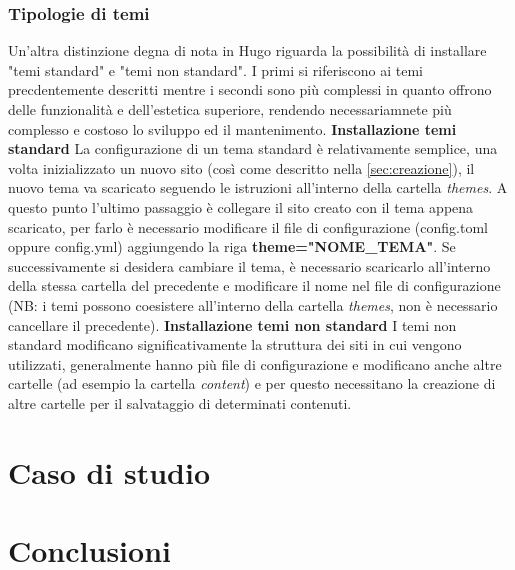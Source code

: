 \documentclass[target=bach,aauheader=]{thud}
\begin{document}
\subsection{Tipologie di temi}
Un'altra distinzione degna di nota in Hugo riguarda la possibilità di installare "temi standard" e "temi non standard". I primi si riferiscono ai temi precdentemente descritti mentre i secondi sono più complessi in quanto offrono delle funzionalità e dell'estetica superiore, rendendo necessariamnete più complesso e costoso lo sviluppo ed il mantenimento.
\newline \newline
\textbf{{\fontsize{12}{14}\selectfont Installazione temi standard}}
\newline \newline
La configurazione di un tema standard è relativamente semplice, una volta inizializzato un nuovo sito (così come descritto nella \cref{sec:creazione}), il nuovo tema va scaricato seguendo le istruzioni all'interno della cartella \textit{themes}. 
A questo punto l'ultimo passaggio è collegare il sito creato con il tema appena scaricato, per farlo è necessario modificare il file di configurazione (config.toml oppure config.yml) aggiungendo la riga \textbf{theme="NOME\_TEMA"}.
\newline
Se successivamente si desidera cambiare il tema, è necessario scaricarlo all'interno della stessa cartella del precedente e modificare il nome nel file di configurazione (NB: i temi possono coesistere all'interno della cartella \textit{themes}, non è necessario cancellare il precedente).
\newline \newline
\textbf{{\fontsize{12}{14}\selectfont Installazione temi non standard}}
\newline \newline
I temi non standard modificano significativamente la struttura dei siti in cui vengono utilizzati, generalmente hanno più file di configurazione e modificano anche altre cartelle (ad esempio la cartella \textit{content}) e per questo necessitano la creazione di altre cartelle per il salvataggio di determinati contenuti.
\chapter{Caso di studio}\label{cap:casostudio}

\chapter{Conclusioni}
\end{document}
